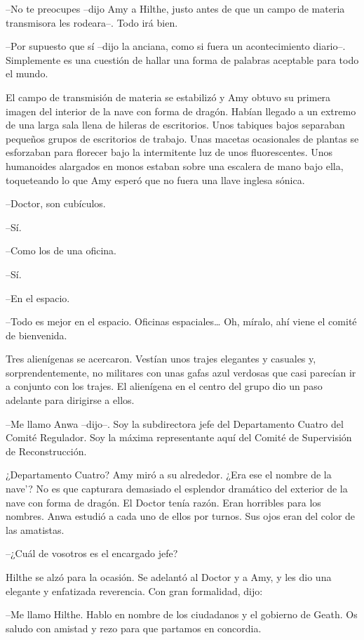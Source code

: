 {--No te preocupes --dijo Amy a Hilthe, justo antes de que un campo de
materia transmisora les rodeara--. Todo irá bien.}

{--Por supuesto que sí --dijo la anciana, como si fuera un
	acontecimiento diario--. Simplemente es una cuestión de hallar una forma
de palabras aceptable para todo el mundo.}

{El campo de transmisión de materia se estabilizó y Amy obtuvo su
	primera imagen del interior de la nave con forma de dragón. Habían
	llegado a un extremo de una larga sala llena de hileras de escritorios.
	Unos tabiques bajos separaban pequeños grupos de escritorios de trabajo.
	Unas macetas ocasionales de plantas se esforzaban para florecer bajo la
	intermitente luz de unos fluorescentes. Unos humanoides alargados en
	monos estaban sobre una escalera de mano bajo ella, toqueteando lo que
Amy esperó que no fuera una llave inglesa sónica.}

{--Doctor, son cubículos.}

{--Sí.}

{--Como los de una oficina.}

{--Sí.}

{--En el espacio.}

{--Todo es mejor en el espacio. Oficinas espaciales\ldots{} Oh,
míralo, ahí viene el comité de bienvenida.}

{Tres alienígenas se acercaron. Vestían unos trajes elegantes y casuales
	y, sorprendentemente, no militares con unas gafas azul verdosas que casi
	parecían ir a conjunto con los trajes. El alienígena en el centro del
grupo dio un paso adelante para dirigirse a ellos.}

{--Me llamo Anwa --dijo--. Soy la subdirectora jefe del Departamento
	Cuatro del Comité Regulador. Soy la máxima representante aquí del Comité
de Supervisión de Reconstrucción.}

{¿Departamento Cuatro? Amy miró a su alrededor. ¿Era ese el nombre de la
	nave'? No es que capturara demasiado el esplendor dramático del exterior
	de la nave con forma de dragón. El Doctor tenía razón. Eran horribles
	para los nombres. Anwa estudió a cada uno de ellos por turnos. Sus ojos
eran del color de las amatistas.}

{--¿Cuál de vosotros es el encargado jefe?}

{Hilthe se alzó para la ocasión. Se adelantó al Doctor y a Amy, y les
dio una elegante y enfatizada reverencia. Con gran formalidad, dijo:}

{--Me llamo Hilthe. Hablo en nombre de los ciudadanos y el gobierno de
Geath. Os saludo con amistad y rezo para que partamos en concordia.}

